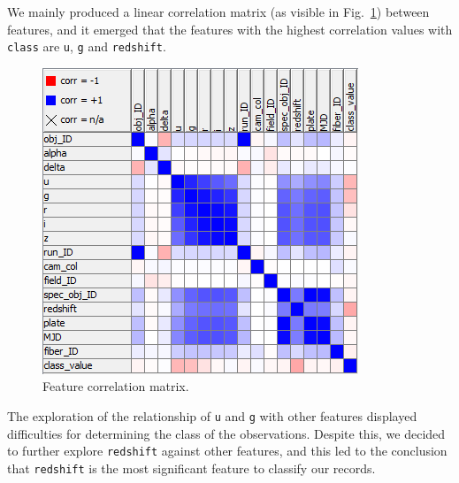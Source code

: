 We mainly produced a linear correlation matrix (as visible in Fig.~\ref{fig:corrmatrix}) between features, and it emerged that the features with the highest correlation values with \texttt{class} are \texttt{u}, \texttt{g} and \texttt{redshift}.
\vspace{-1.5cm}
\begin{figure}[H]
    \includegraphics[width=0.9\columnwidth]{images/Correlation Matrix.png}
    \centering
    \caption{Feature correlation matrix.}
    \label{fig:corrmatrix}
\end{figure}
\vspace{-3cm}
The exploration of the relationship of \texttt{u} and \texttt{g} with other features displayed difficulties for determining the class of the observations. Despite this, we decided to further explore \texttt{redshift} against other features, and this led to the conclusion that \texttt{redshift} is the most significant feature to classify our records.
